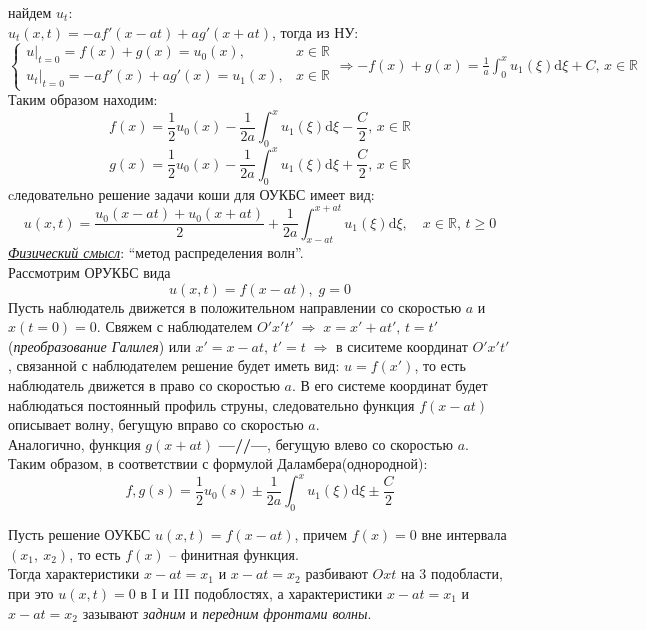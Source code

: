 найдем $u_t$:\\
$u_t(x,t)=-af'(x-at)+ag'(x+at)$, тогда из НУ:\\
$\displaystyle
	\left\{\begin{array}{ll}
		u|_{t=0}=f(x)+g(x)=u_0(x),        & x\in\mathbb R \\
		u_t|_{t=0}=-af'(x)+ag'(x)=u_1(x), & x\in\mathbb R
	\end{array}\right. \Longrightarrow -f(x)+g(x)=\frac1a \int^x_0 u_1(\xi)\mathrm d\xi+C,\,x\in\mathbb R
$\\
Таким образом находим:
$$f(x)=\frac12u_0(x)-\frac1{2a}\int^x_0 u_1(\xi)\mathrm d\xi-\frac C2,\,x \in\mathbb R$$
$$g(x)=\frac12u_0(x)-\frac1{2a}\int^x_0 u_1(\xi)\mathrm d\xi+\frac C2,\,x \in\mathbb R$$
cледовательно решение задачи коши для ОУКБС имеет вид:
\begin{equation}
	u(x,t)=\frac{u_0(x-at)+u_0(x+at)}2 +\frac{1}{2a} \int^{x+at}_{x-at}u_1(\xi)\mathrm{d}\xi,\quad x\in\mathbb R,\,t\ge0
	\tag*{--- формула Даламбера(однородная)}
\end{equation}
\underline{\emph{Физический смысл}}:  ``метод распределения волн''.\\%
Рассмотрим ОРУКБС вида
$$u(x,t)=f(x-at),\;g=0$$
Пусть наблюдатель движется в положительном направлении со скоростью $a$ и $x(t=0)=0$.
Свяжем с наблюдателем $O'x't'\;\Longrightarrow\; x=x'+at',\,t=t'$ (\emph{преобразование Галилея}) или $x'=x-at,\,t'=t\;\Longrightarrow$ в сиситеме координат $O'x't'$, связанной с наблюдателем решение будет иметь вид:
$u=f(x')$, то есть наблюдатель движется в право со скоростью $a$. В его системе координат будет наблюдаться постоянный профиль струны, следовательно функция $f(x-at)$ описывает волну, бегущую вправо со скоростью $a$.\\
Аналогично, функция $g(x+at)$ \textbf{---//---}, бегущую влево со скоростью $a$.\\
Таким образом, в соответствии с формулой Даламбера(однородной):
$$ f,g(s)=\frac12u_0(s)\pm\frac1{2a}\int_0^xu_1(\xi)\mathrm d\xi\pm\frac C2 $$
\begin{note}
	Пусть решение ОУКБС $u(x,t)=f(x-at)$, причем $f(x)=0$ вне интервала $(x_1,\ x_2)$, то есть $f(x)$ -- финитная функция.\\
	Тогда характеристики $x-at=x_1$ и $x-at=x_2$ разбивают $Oxt$ на 3 подобласти,%
	при это $u(x,t)=0$ в I и III подоблостях, а характеристики $x-at=x_1$ и $x-at=x_2$ зазывают \emph{задним} и \emph{передним фронтами волны}.
\end{note}
